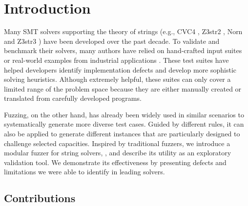 \section{Introduction}

    Many SMT solvers supporting the theory of strings (e.g., CVC4 \cite{cvc4},  Z3str2 \cite{z3str2}, Norn \cite{norn} and Z3str3 \cite{z3str3}) have been developed over the past decade. To validate and benchmark their solvers, many authors have relied on hand-crafted input suites \cite{cvc4-tests} \cite{z3str3-tests} \cite{z3str2-tests} or real-world examples from industrial applications \cite{kaluza} \cite{kausler}. These test suites have helped developers identify implementation defects and develop more sophistic solving heuristics. Although extremely helpful, these suites can only cover a limited range of the problem space because they are either manually created or translated from carefully developed programs. 
    
    
    Fuzzing, on the other hand, has already been widely used in similar scenarios to systematically generate more diverse test cases. Guided by different rules, it can also be applied to generate different instances that are particularly designed to challenge selected capacities. Inspired by traditional fuzzers, we introduce a modular fuzzer for string solvers, \fuzzer{}, and describe its utility as an exploratory validation tool. We demonstrate its effectiveness by presenting defects and limitations we were able to identify in leading solvers.
    
    

    \subsection{Contributions}

